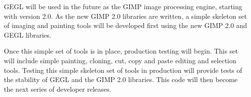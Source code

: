 GEGL will be used in the future as the GIMP image processing engine, starting
with version 2.0. As the new GIMP 2.0 libraries are written, a simple skeleton
set of imaging and painting tools will be developed first using the new GIMP 2.0
and GEGL libraries. 

Once this simple set of tools is in place, production testing will begin. This
set will include simple painting, cloning, cut, copy and paste editing and
selection tools. Testing this simple skeleton set of tools in production will
provide tests of the stability of GEGL and the GIMP 2.0 libraries. This code 
will then become the next series of developer releases.

